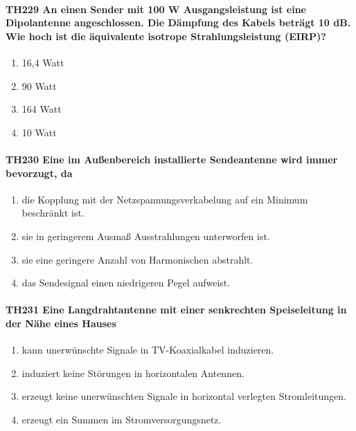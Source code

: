 \documentclass[8pt]{article}
\begin{document}
\paragraph*{TH229 An einen Sender mit 100 W Ausgangsleistung ist eine Dipolantenne angeschlossen. Die Dämpfung des Kabels beträgt 10 dB. Wie hoch ist die äquivalente isotrope Strahlungsleistung (EIRP)?}
\begin{enumerate}[nolistsep,label=\Alph*]
\item 16,4 Watt
\item 90 Watt
\item 164 Watt
\item 10 Watt
\end{enumerate}

\paragraph*{TH230 Eine im Außenbereich installierte Sendeantenne wird immer bevorzugt, da} 
\begin{enumerate}[nolistsep,label=\Alph*]
\item die Kopplung mit der Netzspannungsverkabelung auf ein Minimum beschränkt ist.
\item sie in geringerem Ausmaß Ausstrahlungen unterworfen ist.
\item sie eine geringere Anzahl von Harmonischen abstrahlt.
\item das Sendesignal einen niedrigeren Pegel aufweist.
\end{enumerate}

\paragraph*{TH231 Eine Langdrahtantenne mit einer senkrechten Speiseleitung in der Nähe eines Hauses} 
\begin{enumerate}[nolistsep,label=\Alph*]
\item kann unerwünschte Signale in TV-Koaxialkabel induzieren.
\item induziert keine Störungen in horizontalen Antennen.
\item erzeugt keine unerwünschten Signale in horizontal verlegten Stromleitungen.
\item erzeugt ein Summen im Stromversorgungsnetz.
\end{enumerate}
\end{document}
